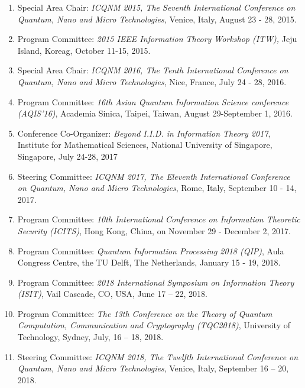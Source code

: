 \begin{enumerate}
\item
Special Area Chair: 
{\em ICQNM 2015, The Seventh International Conference on Quantum, Nano and Micro Technologies,} Venice, Italy, August 23 - 28, 2015.

\item
Program Committee: 
{\em 2015 IEEE Information Theory Workshop (ITW),} 
Jeju Island, Koreag, October 11-15, 2015.

\item
Special Area Chair: 
{\em ICQNM 2016, The Tenth International Conference on Quantum, Nano and Micro Technologies}, Nice, France, July 24 - 28, 2016.

\item
Program Committee:
{\em 16th Asian Quantum Information Science conference (AQIS'16)}, Academia Sinica, Taipei, Taiwan, August 29-September 1, 2016.

\item
Conference Co-Organizer:
{\em Beyond I.I.D. in Information Theory 2017}, 
Institute for Mathematical Sciences, National University of Singapore, Singapore, July 24-28, 2017

\item
Steering Committee: 
{\em ICQNM 2017, The Eleventh International Conference on Quantum, Nano and Micro Technologies}, 
Rome, Italy, September 10 - 14, 2017.

\item
Program Committee:
{\em 10th International Conference on Information Theoretic Security (ICITS)}, 
Hong Kong, China, on November 29 - December 2, 2017.
 
\item
Program Committee: 
{\em Quantum Information Processing 2018 (QIP)}, 
Aula Congress Centre, the TU Delft, The Netherlands,
January 15 - 19, 2018.

\item
Program Committee: 
{\em 2018 International Symposium on Information Theory (ISIT)}, 
Vail Cascade, CO, USA, June 17 -- 22,  2018.

\item
Program Committee: 
{\em The 13th Conference on the Theory of Quantum Computation, Communication and Cryptography (TQC2018)}, 
University of Technology, Sydney,
July, 16 -- 18, 2018.

\item
Steering Committee: 
{\em ICQNM 2018, The Twelfth International Conference on Quantum, Nano and Micro Technologies}, 
Venice, Italy, September 16 -- 20, 2018.


\end{enumerate}
